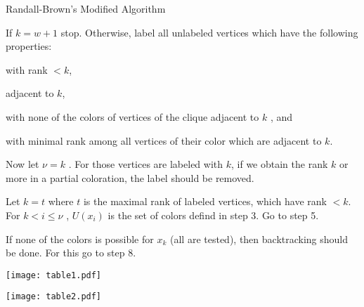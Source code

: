 \documentclass{beamer}
\begin{document}
\begin{frame}{Randall-Brown's Modified Algorithm}
\begin{enumerate}
{\item  If $k = w + 1$ stop. Otherwise, label all unlabeled vertices which have the
following properties:
\begin{enumerate}[(i)]
{\tiny \item with rank $< k$,

\item adjacent to $k$,

\item with none of the colors of vertices of the clique adjacent to $k$ , and
\item with minimal rank among all vertices of their color which are adjacent
to $k$.}
\end{enumerate}
Now let $\nu = k$ . For those vertices are labeled with $k$, if we obtain the rank
$k$ or more in a partial coloration, the label should be removed.\\

 
\item  Let $k = t$ where $t$ is the maximal rank of labeled vertices, which have rank $< k$. For $k < i \leq \nu$ , $U(x_i)$ is the set of colors defind in step 3. Go to step 5.\\

 
\item  If none of the colors is possible for $x_k$ (all are tested), then backtracking
should be done. For this go to step 8.\\}
\end{enumerate}

\end{frame}


\begin{comment}
\begin{frame}[fragile]{AMPL Model for vertex cover restricted to maximal cliques}


\begin{verbatim}
# Declarations
set V;
set E within V cross V;
set Idx;
set Q within Idx cross V;
set cnt within Idx cross V;
var x {v in V} binary;
# integrality constraints.
# Objective Function
minimize cover_size: sum { v in V } x[v];
# Constraints
subject to clique {c in Idx}:
sum {(a, b) in Q: a=c} x[b] >= card{(a,b) in Q: a=c}-1;
\end{verbatim}

\end{frame}
\end{comment}

\begin{frame}

\begin{center}

\texttt{[image: table1.pdf]}

\end{center}
\end{frame}
\begin{frame}
\begin{center}

\texttt{[image: table2.pdf]}

\end{center}
\end{frame}
\end{document}
